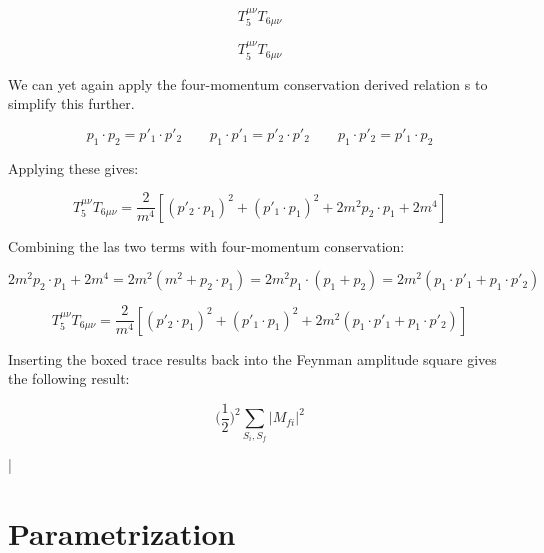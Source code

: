 \documentclass[a4]{article}
\begin{document}
    \begin{equation}
        T_5^{\mu \nu} T_{6 \mu \nu}
    \end{equation}

    \begin{equation}
        T_5^{\mu \nu} T_{6 \mu \nu}
    \end{equation}

    We can yet again apply the four-momentum conservation derived relation s to simplify this further.

    \begin{equation}
        p_1 \cdot p_2 = p'_1 \cdot p'_2 \qquad p_1 \cdot p'_1 = p'_2 \cdot p'_2 \qquad p_1 \cdot p'_2 = p'_1 \cdot p_2
    \end{equation}

    Applying these gives:

    \begin{equation}
        T_5^{\mu \nu} T_{6 \mu \nu} = \frac{2}{m^4} [(p'_2 \cdot p_1)^2 + (p'_1 \cdot p_1)^2 + 2 m^2 p_2 \cdot p_1 + 2 m^4]
    \end{equation}

    Combining the las two terms with four-momentum conservation:

    \begin{equation}
        2 m^2 p_2 \cdot p_1 + 2 m^4 = 2 m^2 (m^2 + p_2 \cdot p_1) = 2 m^2 p_1 \cdot (p_1 + p_2) = 2 m^2 (p_1 \cdot p'_1 + p_1 \cdot p'_2)
    \end{equation}

    \begin{framed}
        \begin{equation}
            T_5^{\mu \nu} T_{6 \mu \nu} = \frac{2}{m^4} [(p'_2 \cdot p_1)^2 + (p'_1 \cdot p_1)^2 + 2 m^2 (p_1 \cdot p'_1 + p_1 \cdot p'_2)]
        \end{equation}
    \end{framed}

    Inserting the boxed trace results back into the Feynman amplitude square gives the following result:

    \begin{equation}
        \Big( \frac{1}{2} \Big)^2 \sum_{S_i, S_f} |M_{f i}|^2
    \end{equation}

    \begin{framed}
        |
    \end{framed}

    \section*{Parametrization}
\end{document}
